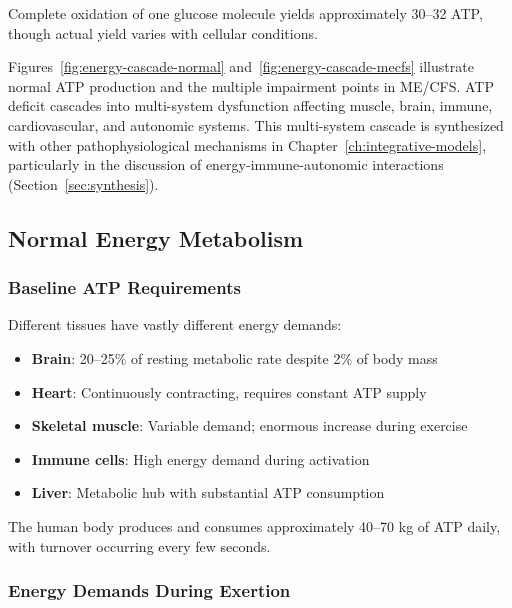 Complete oxidation of one glucose molecule yields approximately 30--32 ATP, though actual yield varies with cellular conditions.





Figures~\ref{fig:energy-cascade-normal} and~\ref{fig:energy-cascade-mecfs} illustrate normal ATP production and the multiple impairment points in ME/CFS. ATP deficit cascades into multi-system dysfunction affecting muscle, brain, immune, cardiovascular, and autonomic systems. This multi-system cascade is synthesized with other pathophysiological mechanisms in Chapter~\ref{ch:integrative-models}, particularly in the discussion of energy-immune-autonomic interactions (Section~\ref{sec:synthesis}).

\subsection{Normal Energy Metabolism}
\label{sec:normal-metabolism}

\subsubsection{Baseline ATP Requirements}

Different tissues have vastly different energy demands:

\begin{itemize}
    \item \textbf{Brain}: 20--25\% of resting metabolic rate despite 2\% of body mass
    \item \textbf{Heart}: Continuously contracting, requires constant ATP supply
    \item \textbf{Skeletal muscle}: Variable demand; enormous increase during exercise
    \item \textbf{Immune cells}: High energy demand during activation
    \item \textbf{Liver}: Metabolic hub with substantial ATP consumption
\end{itemize}

The human body produces and consumes approximately 40--70 kg of ATP daily, with turnover occurring every few seconds.

\subsubsection{Energy Demands During Exertion}

